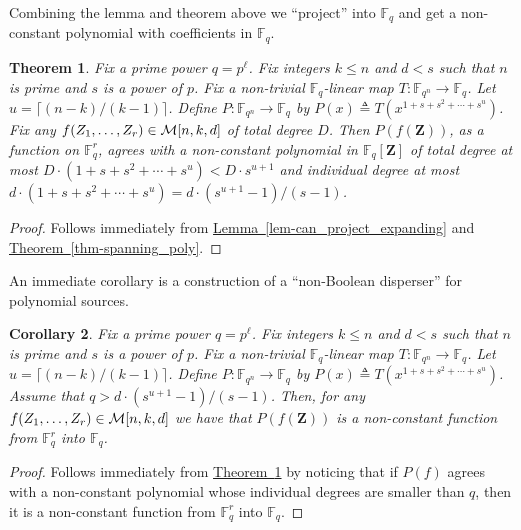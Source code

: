 \documentclass[10pt]{article}
\newtheorem{theorem}{Theorem}[section]
\newtheorem{corollary}[theorem]{Corollary}
\theoremstyle{definition}
\numberwithin{equation}{section}
\newcommand{\expref}[2]{\texorpdfstring{\hyperref[#2]{#1~\ref{#2}}}{#1~\ref{#2}}}
\newcommand{\F}{\mathbb F_q}
\newcommand{\Fn}{\mathbb F_{q^n}}
\newcommand{\M}[3]{{\cal M}[#1,#2,#3]}
\newcommand{\zi}{\textbf{Z}}
\begin{document}
Combining the lemma and theorem above we ``project'' into $\F$ and get a non-constant polynomial with
coefficients in $\F$.
\begin{theorem}\label{thm-main_const}
Fix a prime power $q=p^{\ell}$. Fix integers $k\leq n$ and $d<s$ such that $n$ is prime
and $s$ is a power of $p$. Fix a non-trivial $\F$-linear map $T:\Fn\to \F$.
Let $u= \lceil (n-k)/(k-1)\rceil $.
Define $P:\Fn\to \F$ by $P(x) \triangleq T(x^{1+s+s^2+\cdots +  s^u})$.
Fix any $f(Z_1,\ldots,Z_r)\in \M{n}{k}{d}$ of total degree $D$. Then $P(f(\zi))$, as a function
on $\F^r$, agrees with a non-constant polynomial in $\F[\zi]$ of total degree
at most $D\cdot (1+ s+ s^2 +\cdots + s^u)< D\cdot s^{u+1}$
and individual degree at most $d\cdot(1+ s+ s^2 +\cdots + s^u) = d\cdot (s^{u+1}-1)/(s-1)$.
\end{theorem}
\begin{proof}
Follows immediately from \expref{Lemma}{lem-can_project_expanding} and \expref{Theorem}{thm-spanning_poly}.
\end{proof}

An immediate corollary is a construction of a ``non-Boolean disperser'' for polynomial sources.
\begin{corollary}\label{cor-disp}
Fix a prime power $q=p^{\ell}$. Fix integers $k\leq n$ and $d<s$ such that $n$ is prime
and $s$ is a power of $p$. Fix a non-trivial $\F$-linear map $T:\Fn\to \F$.
Let $u= \lceil (n-k)/(k-1)\rceil $.
Define $P:\Fn\to \F$ by $P(x) \triangleq T(x^{1+s+s^2+\cdots +  s^u})$.
Assume that $q> d\cdot (s^{u+1}-1)/(s-1)$.
Then, for any $f(Z_1,\ldots,Z_r)\in \M{n}{k}{d}$ we have that $P(f(\zi))$ is  a non-constant function
from $\F^r$ into $\F$.
\end{corollary}
\begin{proof}
Follows immediately from \expref{Theorem}{thm-main_const} by noticing that if
$P(f)$ agrees with a non-constant polynomial whose individual degrees are smaller than $q$,
then it is a non-constant function from $\F^r$ into $\F$.
\end{proof}
\end{document}
